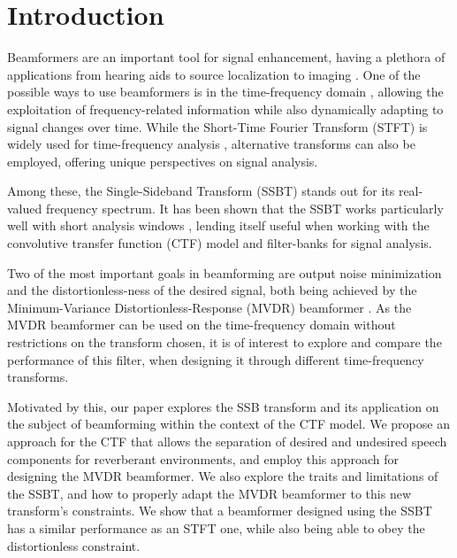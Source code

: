 \section{Introduction}
\label{sec:introduction}

Beamformers are an important tool for signal enhancement, having a plethora of applications from hearing aids \cite{lobato_worst-case-optimization_2020} to source localization \cite{chen_source_2002} to imaging \cite{lu_biomedical_1994,nguyen_minimum_2017}. One of the possible ways to use beamformers is in the time-frequency domain \cite{benesty_fundamentals_2017}, allowing the exploitation of frequency-related information while also dynamically adapting to signal changes over time. While the Short-Time Fourier Transform (STFT) is widely used for time-frequency analysis \cite{kiymik_comparison_2005,pan_microphone_2021}, alternative transforms \cite{chen_wavelet-based_2018,yang_general_2014,almeida_fractional_1994} can also be employed, offering unique perspectives on signal analysis.

Among these, the Single-Sideband Transform (SSBT) \cite{crochiere_multirate_1983,oyzerman_speech_2012} stands out for its real-valued frequency spectrum. It has been shown that the SSBT works particularly well with short analysis windows \cite{crochiere_multirate_1983}, lending itself useful when working with the convolutive transfer function (CTF) model \cite{talmon_relative_2009} and filter-banks \cite{kumatani_filter_2008,gopinath_tutorial_1993} for signal analysis.

Two of the most important goals in beamforming are output noise minimization and the distortionless-ness of the desired signal, both being achieved by the Minimum-Variance Distortionless-Response (MVDR) beamformer \cite{capon_high-resolution_1969,erdogan_improved_2016}. As the MVDR beamformer can be used on the time-frequency domain without restrictions on the transform chosen, it is of interest to explore and compare the performance of this filter, when designing it through different time-frequency transforms.

Motivated by this, our paper explores the SSB transform and its application on the subject of beamforming within the context of the CTF model. We propose an approach for the CTF that allows the separation of desired and undesired speech components for reverberant environments, and employ this approach for designing the MVDR beamformer. We also explore the traits and limitations of the SSBT, and how to properly adapt the MVDR beamformer to this new transform's constraints. We show that a beamformer designed using the SSBT has a similar performance as an STFT one, while also being able to obey the distortionless constraint.

